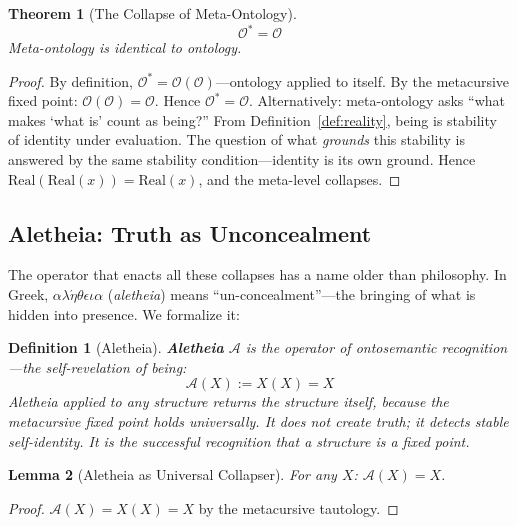 \documentclass[12pt, letterpaper]{book}
\def\equiv{=}%
\newtheorem{theorem}{Theorem}[chapter]
\newtheorem{lemma}[theorem]{Lemma}
\newtheorem{definition}{Definition}[chapter]
\begin{document}
\begin{theorem}[The Collapse of Meta-Ontology]\label{thm:meta-ontology}
\[
\boxed{\mathcal{O}^* \equiv \mathcal{O}}
\]
Meta-ontology is identical to ontology.
\end{theorem}

\begin{proof}
By definition, $\mathcal{O}^* \equiv \mathcal{O}(\mathcal{O})$---ontology applied to itself. By the metacursive fixed point: $\mathcal{O}(\mathcal{O}) \equiv \mathcal{O}$. Hence $\mathcal{O}^* \equiv \mathcal{O}$. Alternatively: meta-ontology asks ``what makes `what is' count as being?'' From Definition~\ref{def:reality}, being is stability of identity under evaluation. The question of what \textit{grounds} this stability is answered by the same stability condition---identity is its own ground. Hence $\mathrm{Real}(\mathrm{Real}(x)) \equiv \mathrm{Real}(x)$, and the meta-level collapses.
\end{proof}

\subsection{Aletheia: Truth as Unconcealment}

The operator that enacts all these collapses has a name older than philosophy. In Greek, $\alpha\lambda\acute{\eta}\theta\epsilon\iota\alpha$ (\textit{aletheia}) means ``un-concealment''---the bringing of what is hidden into presence. We formalize it:

\begin{definition}[Aletheia]\label{def:aletheia}
\textbf{Aletheia} $\mathcal{A}$ is the operator of ontosemantic recognition---the self-revelation of being:
\[
\mathcal{A}(X) := X(X) \equiv X
\]
Aletheia applied to any structure returns the structure itself, because the metacursive fixed point holds universally. It does not create truth; it \textit{detects stable self-identity}. It is the successful recognition that a structure is a fixed point.
\end{definition}

\begin{lemma}[Aletheia as Universal Collapser]\label{lem:aletheia}
For any $X$: $\mathcal{A}(X) \equiv X$.
\end{lemma}

\begin{proof}
$\mathcal{A}(X) \equiv X(X) \equiv X$ by the metacursive tautology.
\end{proof}
\end{document}
